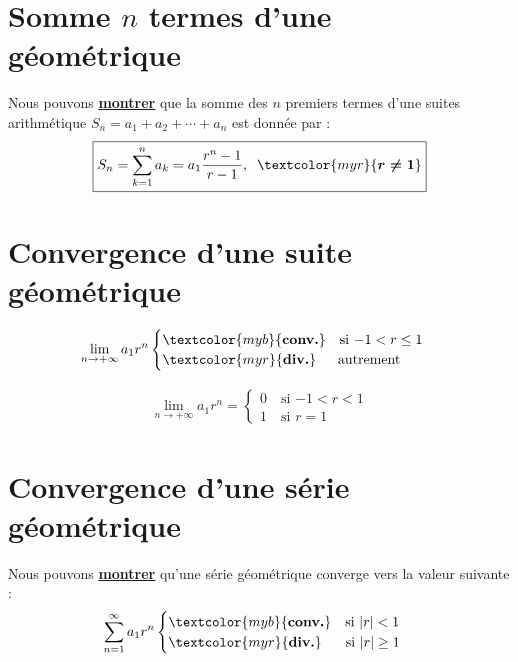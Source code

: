 \documentclass{report}
\begin{document}
\begin{multicols*}{3}
        \section{Somme $n$ termes d'une géométrique}
        Nous pouvons \hyperlink{Somme des n premiers termes géométrique}{\textbf{montrer}}
        que la somme des $n$ premiers termes d'une suites arithmétique
            $S_n = a_1 + a_2 + \cdots + a_n$ est donnée par :
    \[%
        \boxed{S_n = \sum_{k=1}^{n }a_k = a_1\dfrac{r^{n} - 1}{r - 1}, 
            \;\; \textcolor{myr}{\boldsymbol{r \neq 1}}}    
        \]%

        \section{Convergence d'une suite géométrique}
        \vspace{-1em}
        \noindent       
        \begin{align*}
            \lim\limits_{n\to+\infty }a_1r^n  
                    \begin{cases}
                        \textcolor{myb}{\textbf{conv.}}  \quad \text{si $-1 < r \leq 1$} \\
                        \textcolor{myr}{\textbf{div.}}  \quad\;\; \text{autrement}
                    \end{cases}
        \end{align*}


        \begin{align*}
            \boxed{
            \lim\limits_{n\to+\infty }a_1r^n = 
                    \begin{cases}
                        0 \quad \text{si $-1 < r < 1$} \\
                        1 \quad \text{si $r = 1$}
                \end{cases}}
        \end{align*}


    \section{Convergence d'une série géométrique}
        Nous pouvons \hyperlink{Convergence série géométrique}{\textbf{montrer}}
        qu'une série géométrique converge vers la valeur suivante :
        \begin{align*}
                \sum_{n=1}^{\infty }a_1r^n  
                    \begin{cases}
                    \textcolor{myb}{\textbf{conv.}}  \quad \text{si $|r| < 1$} \\
                    \textcolor{myr}{\textbf{div.}}  \quad\;\;\, \text{si $|r| \geq 1$}
                \end{cases}
        \end{align*}


\end{multicols*}
\end{document}
